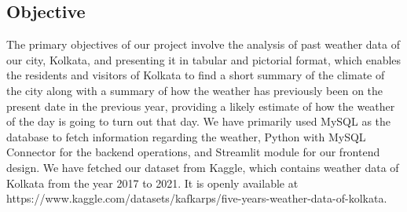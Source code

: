 \documentclass[12pt, a4paper]{article}
\begin{document}
\subsection{Objective}
The primary objectives of our project involve the analysis of past weather data of our city, Kolkata, and presenting it in tabular and pictorial format, which enables the residents and visitors of Kolkata to find a short summary of the climate of the city along with a summary of how the weather has previously been on the present date in the previous year, providing a likely estimate of how the weather of the day is going to turn out that day. We have primarily used MySQL as the database to fetch information regarding the weather, Python with MySQL Connector for the backend operations, and Streamlit module for our frontend design. We have fetched our dataset from Kaggle, which contains weather data of Kolkata \cite{kaggleWeather_data_of_Kolkata} from the year 2017 to 2021. It is openly available at {https://www.kaggle.com/datasets/kafkarps/five-years-weather-data-of-kolkata}.
\newpage
\end{document}
